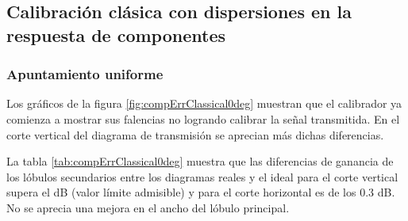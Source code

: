 \subsection{Calibración clásica con dispersiones en la respuesta de componentes}

\subsubsection{Apuntamiento uniforme}

Los gráficos de la figura \ref{fig:compErrClassical0deg} muestran que el calibrador ya comienza a mostrar sus falencias no 
logrando calibrar la señal transmitida. En el corte vertical del diagrama de transmisión se aprecian más dichas diferencias.

La tabla \ref{tab:compErrClassical0deg} muestra que las diferencias de ganancia de los lóbulos secundarios entre los diagramas 
reales y el ideal para el corte vertical supera el dB (valor límite admisible) y para el corte horizontal es de los 0.3 dB. No 
se aprecia una mejora en el ancho del lóbulo principal.
